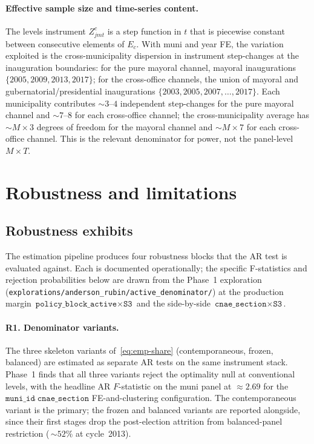 \documentclass{article}
\theoremstyle{plain}
\theoremstyle{definition}
\theoremstyle{remark}
\begin{document}
\paragraph{Effective sample size and time-series content.}
The levels instrument $Z^{c}_{jmt}$ is a step function in $t$ that is
piecewise constant between consecutive elements of $E_c$. With muni and
year FE, the variation exploited is the cross-municipality dispersion in
instrument step-changes at the inauguration boundaries: for the pure
mayoral channel, mayoral inaugurations $\{2005,2009,2013,2017\}$; for the
cross-office channels, the union of mayoral and gubernatorial/presidential
inaugurations $\{2003,2005,2007,\ldots,2017\}$. Each municipality
contributes $\sim 3$--$4$ independent step-changes for the pure mayoral
channel and $\sim 7$--$8$ for each cross-office channel; the
cross-municipality average has $\sim M\times 3$ degrees of freedom for
the mayoral channel and $\sim M\times 7$ for each cross-office channel.
This is the relevant denominator for power, not the panel-level
$M\times T$.

\section{Robustness and limitations}\label{sec:robustness}

\subsection{Robustness exhibits}\label{subsec:robustness}

The estimation pipeline produces four robustness blocks that the AR test is
evaluated against. Each is documented operationally; the specific
F-statistics and rejection probabilities below are drawn from the Phase~1
exploration (\texttt{explorations/anderson\_rubin/active\_denominator/}) at
the production margin $\texttt{policy\_block\_active}\times\texttt{S3}$ and
the side-by-side $\texttt{cnae\_section}\times\texttt{S3}$.

\paragraph{R1. Denominator variants.}
The three skeleton variants of~\autoref{eq:emp-share} (contemporaneous,
frozen, balanced) are estimated as separate AR tests on the same
instrument stack. Phase~1 finds that all three variants reject the
optimality null at conventional levels, with the headline AR $F$-statistic
on the muni panel at $\approx 2.69$ for the
$\texttt{muni\_id}\hat{\;}\texttt{cnae\_section}$ FE-and-clustering
configuration. The contemporaneous variant is the primary; the frozen and
balanced variants are reported alongside, since their first stages drop
the post-election attrition from balanced-panel restriction
(\,$\sim 52\%$ at cycle~2013).
\end{document}
